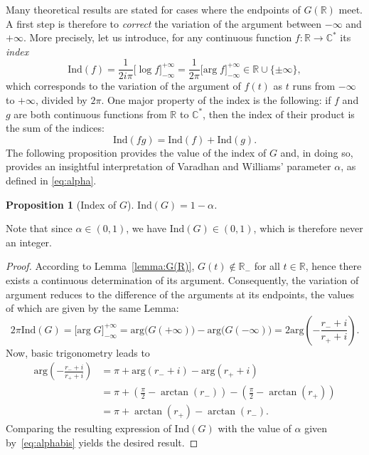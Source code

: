 \documentclass{article}
\theoremstyle{plain}
\newtheorem{proposition}[theorem]{Proposition}
\theoremstyle{definition}
\theoremstyle{remark}
\begin{document}
Many theoretical results are stated for cases where the endpoints of $G(\mathbb R)$ meet. A first step is therefore to \textit{correct} the variation of the argument between $-\infty$ and $+\infty$. More precisely, let us introduce, for any continuous function $f:\mathbb R\to \mathbb C^*$ its  \textit{index}
$$\mathrm{Ind}(f)=\frac{1}{2i\pi}\big[\log f\big]_{-\infty}^{+\infty}=\frac{1}{2\pi}\big[\mathrm{arg}\; f\big]_{-\infty}^{+\infty}\in \mathbb R\cup\{\pm\infty\},$$
which corresponds to the variation of the argument of $f(t)$ as $t$ runs from $-\infty$
 to $+\infty$, divided by $2\pi$. One major property of the index is the following: if $f$ and $g$ are both continuous functions from $\mathbb R$ to $\mathbb C^*$, then the index of their product is the sum of the indices:
 $$\mathrm{Ind}(fg)=\mathrm{Ind}(f)+\mathrm{Ind}(g).$$
The following proposition provides the value of the index of $G$ and, in doing so, provides an insightful interpretation of Varadhan and Williams' parameter $\alpha$, as defined in \eqref{eq:alpha}.
\begin{proposition}[Index of $G$]
    $\mathrm{Ind}(G)=1-\alpha$.
\end{proposition}
Note that since $\alpha\in(0,1)$, we have $\mathrm{Ind}(G)\in(0,1)$, which is therefore never an integer.
\begin{proof} According to Lemma~\ref{lemma:G(R)}, $G(t)\notin \mathbb R_{-}$ for all $t\in\mathbb R$, hence there exists a continuous determination of its argument. Consequently, the variation of argument reduces to the difference of the arguments at its endpoints, the values of which are given by the same Lemma:
\begin{equation*}
    2\pi\mathrm{Ind}(G)=\big[\mathrm{arg}\;G\big]_{-\infty}^{+\infty}=\mathrm{arg}\big(G(+\infty)\big)-\mathrm{arg}\big(G(-\infty)\big)=2\mathrm{arg}\left(-\frac{r_-+i}{r_++i}\right).
\end{equation*}
Now, basic trigonometry leads to
\begin{align*}
\mathrm{arg}\left(-\frac{r_-+i}{r_++i}\right)&=\pi+\mathrm{arg}(r_-+i)-\mathrm{arg}(r_++i)\\
&=\pi+\left(\frac{\pi}{2}-\arctan(r_-)\right)-\left(\frac{\pi}{2}-\arctan(r_+)\right)\\
&=\pi+\arctan(r_+)-\arctan(r_-).
\end{align*}
Comparing the resulting expression of $\mathrm{Ind}(G)$ with the value of $\alpha$ given by~\eqref{eq:alphabis} yields the desired result.
\end{proof}
\end{document}
